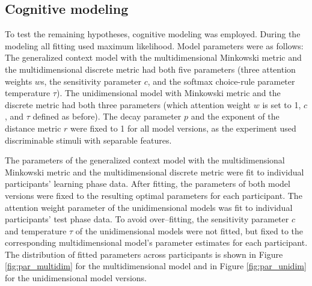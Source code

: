 \documentclass[a4paper,man,natbib]{apa6}
\begin{document}
\subsection{Cognitive modeling}
To test the remaining hypotheses, cognitive modeling was employed. During the modeling all fitting used maximum likelihood. Model parameters were as follows: The generalized context model with the multidimensional Minkowski metric and the multidimensional discrete metric had both five parameters (three attention weights $w$s, the sensitivity parameter $c$, and the softmax choice-rule parameter temperature $\tau$). The unidimensional model with Minkowski metric and the discrete metric had both three parameters (which attention weight $w$ is set to 1, $c$, and $\tau$ defined as before). The decay parameter $p$ and the exponent of the distance metric $r$ were fixed to 1 for all model versions, as the experiment used discriminable stimuli with separable features. 

The parameters of the generalized context model with the multidimensional Minkowski metric and the multidimensional discrete metric were fit to individual participants’ learning phase data. After fitting, the parameters of both model versions were fixed to the resulting optimal parameters for each participant. The attention weight parameter of the unidimensional models was fit to individual participants’ test phase data. To avoid over--fitting, the sensitivity parameter $c$ and temperature $\tau$ of the unidimensional models were not fitted, but fixed to the corresponding multidimensional model’s parameter estimates for each participant. The distribution of fitted parameters across participants is shown in Figure \ref{fig:par_multidim} for the multidimensional model and in Figure \ref{fig:par_unidim} for the unidimensional model versions. 
\end{document}

